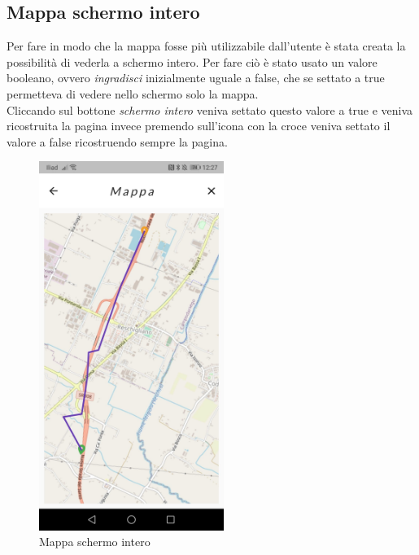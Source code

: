 \newpage

\subsection{Mappa schermo intero}
Per fare in modo che la mappa fosse più utilizzabile dall'utente è stata creata la possibilità di vederla a schermo intero.
Per fare ciò è stato usato un valore booleano, ovvero \textit{ingradisci} inizialmente uguale a false, che se settato a true permetteva di vedere nello schermo solo la mappa.\\
Cliccando sul bottone \textit{schermo intero} veniva settato questo valore a true e veniva ricostruita la pagina invece premendo sull'icona con la croce veniva settato il valore a false ricostruendo sempre la pagina.\\

\begin{figure}[htbp]	
	\centering
	\includegraphics[width=6cm]{immagini/mappaintero.jpeg}
	\caption{Mappa schermo intero}
	\label{fig:Mappa schermo intero}
\end{figure}

\newpage

